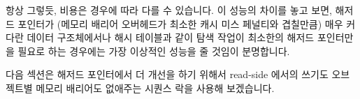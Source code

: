 {	항상 그렇듯, 비용은 경우에 따라 다를 수 있습니다.
	이 성능의 차이를 놓고 보면, 해저드 포인터가 (메모리 배리어 오버헤드가
	최소한 캐시 미스 페널티와 겹칠만큼) 매우 커다란 데이터 구조체에서나
	해시 테이블과 같이 탐색 작업이 최소한의 해저드 포인터만을 필요로 하는
	경우에는 가장 이상적인 성능을 줄 것임이 분명합니다.

} \QuickQuizEnd

다음 섹션은 해저드 포인터에서 더 개선을 하기 위해서 read-side 에서의 쓰기도
오브젝트별 메모리 배리어도 없애주는 시퀀스 락을 사용해 보겠습니다.

